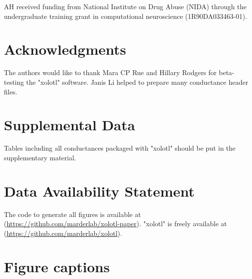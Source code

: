 \documentclass{frontiersSCNS} %
\begin{document}
AH received funding from National Institute on Drug Abuse (NIDA) through the undergraduate training grant in computational neuroscience (1R90DA033463-01).

\section*{Acknowledgments}
The authors would like to thank Mara CP Rue and Hillary Rodgers for beta-testing the "xolotl" software. Janis Li helped to prepare many conductance header files.

\section*{Supplemental Data}
Tables including all conductances packaged with "xolotl" should be put in the supplementary material.

\section*{Data Availability Statement}

The code to generate all figures is available at (\url{https://github.com/marderlab/xolotl-paper}). "xolotl" is freely available at (\url{https://github.com/marderlab/xolotl}).

%
%
%
%
%
%

\printbibliography

%
%
%
%
%
%


\section*{Figure captions}

\FloatBarrier
\end{document}
